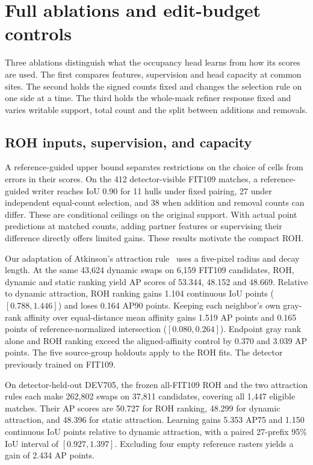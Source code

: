 \documentclass[journal]{IEEEtran}
\begin{document}
\section{Full ablations and edit-budget controls}
\label{sec:ablation}
Three ablations distinguish what the occupancy head learns from how its scores are used. The first compares features, supervision and head capacity at common sites. The second holds the signed counts fixed and changes the selection rule on one side at a time. The third holds the whole-mask refiner response fixed and varies writable support, total count and the split between additions and removals.

\subsection{ROH inputs, supervision, and capacity}

A reference-guided upper bound separates restrictions on the choice of cells from errors in their scores. On the 412 detector-visible FIT109 matches, a reference-guided writer reaches IoU 0.90 for 11 hulls under fixed pairing, 27 under independent equal-count selection, and 38 when addition and removal counts can differ. These are conditional ceilings on the original support. With actual point predictions at matched counts, adding partner features or supervising their difference directly offers limited gains. These results motivate the compact ROH.

Our adaptation of Atkinson's attraction rule~\cite{atkinson} uses a five-pixel radius and decay length. At the same 43,624 dynamic swaps on 6,159 FIT109 candidates, ROH, dynamic and static ranking yield AP scores of 53.344, 48.152 and 48.669. Relative to dynamic attraction, ROH ranking gains 1.104 continuous IoU points (\([0.788,1.446]\)) and loses 0.164 AP90 points. Keeping each neighbor's own gray-rank affinity over equal-distance mean affinity gains 1.519 AP points and 0.165 points of reference-normalized intersection (\([0.080,0.264]\)). Endpoint gray rank alone and ROH ranking exceed the aligned-affinity control by 0.370 and 3.039 AP points. The five source-group holdouts apply to the ROH fits. The detector previously trained on FIT109.

On detector-held-out DEV705, the frozen all-FIT109 ROH and the two attraction rules each make 262,802 swaps on 37,811 candidates, covering all 1,447 eligible matches. Their AP scores are 50.727 for ROH ranking, 48.299 for dynamic attraction, and 48.396 for static attraction. Learning gains 5.353 AP75 and 1.150 continuous IoU points relative to dynamic attraction, with a paired 27-prefix 95\% IoU interval of \([0.927,1.397]\). Excluding four empty reference rasters yields a gain of 2.434 AP points.
\end{document}
